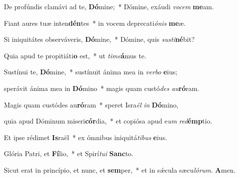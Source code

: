 \item De profúndis clamávi ad te, \textbf{Dó}mine;~* Dómine, exáudi \textit{vocem} \textbf{me}am.

\item Fiant aures tuæ inten\textbf{dén}tes~* in vocem deprecati\textit{ónis} \textbf{me}æ.

\item Si iniquitátes observáveris, \textbf{Dó}mine,~* Dómine, quis \textit{susti}\textbf{né}bit?

\item Quia apud te propitiáti\textbf{o} est,~* ut \textit{time}\textbf{á}mus te.

\item Sustínui te, \textbf{Dó}mine,~* sustínuit ánima mea in \textit{verbo} \textbf{e}ius;

\item sperávit ánima mea in \textbf{Dó}mino~* magis quam custó\textit{des} \textit{au}\textbf{ró}ram.

\item Magis quam custódes au\textbf{ró}ram~* speret Isra\textit{ël} \textit{in} \textbf{Dó}mino,

\item quia apud Dóminum miseri\textbf{cór}dia,~* et copiósa apud e\textit{um} \textit{red}\textbf{émp}tio.

\item Et ipse rédimet \textbf{Is}raël~* ex ómnibus iniquitá\textit{tibus} \textbf{e}ius.

\item Glória Patri, et \textbf{Fí}lio,~* et Spirí\textit{tui} \textbf{Sanc}to.

\item Sicut erat in princípio, et nunc, et \textbf{sem}per,~* et in sǽcula sæcu\textit{lórum}. \textbf{A}men.